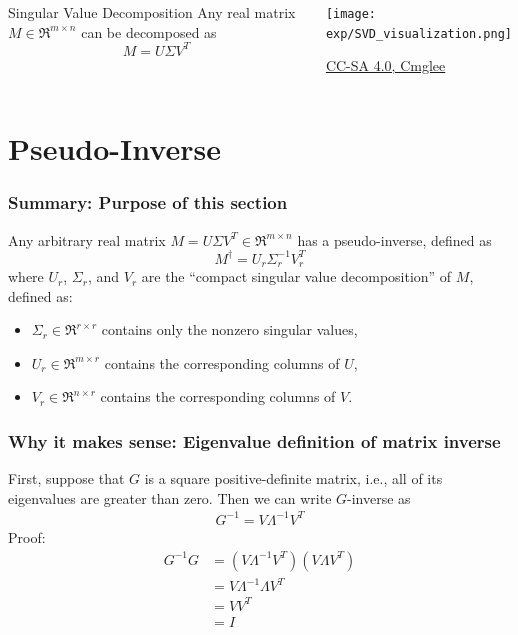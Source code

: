 \documentclass{beamer}
\begin{document}
\begin{frame}
  \begin{columns}[t]
    \column{2.5in}
    \begin{block}{Singular Value Decomposition}
      Any real matrix $M\in\Re^{m\times n}$ can be decomposed as
      \[
      M=U\Sigma V^T
      \]
    \end{block}
    \column{2.25in}
    \begin{block}{}
      \centerline{\texttt{[image: exp/SVD\_visualization.png]}}
      \centerline{\tiny\href{https://en.wikipedia.org/wiki/Singular_value_decomposition}{CC-SA 4.0, Cmglee}}
    \end{block}
  \end{columns}
\end{frame}

\section{Pseudo-Inverse}
\setcounter{subsection}{1}

\begin{frame}
  \frametitle{Summary: Purpose of this section}

  Any arbitrary real matrix $M=U\Sigma V^T\in\Re^{m\times n}$ has a
  pseudo-inverse, defined as
  \begin{displaymath}
    M^\dag = U_r\Sigma_r^{-1} V_r^T
  \end{displaymath}
  where $U_r$, $\Sigma_r$, and $V_r$ are the ``compact singular value
  decomposition'' of $M$, defined as:
  \begin{itemize}
  \item $\Sigma_r\in\Re^{r\times r}$ contains only the nonzero singular values,
  \item $U_r\in\Re^{m\times r}$ contains the corresponding columns of $U$,
  \item $V_r\in\Re^{n\times r}$ contains the corresponding columns of $V$.
  \end{itemize}
\end{frame}
  
\begin{frame}
  \frametitle{Why it makes sense: Eigenvalue definition of matrix inverse}

  First, suppose that $G$ is a square positive-definite matrix, i.e.,
  all of its eigenvalues are greater than zero.  Then we can write
  $G$-inverse as
  \begin{align*}
    G^{-1} = V\Lambda^{-1}V^T
  \end{align*}
  Proof:
  \begin{align*}
    G^{-1}G &= \left(V\Lambda^{-1}V^T\right)\left(V\Lambda V^T\right)\\
    &= V\Lambda^{-1}\Lambda V^T\\
    &= VV^T\\
    &= I
  \end{align*}
\end{frame}
\end{document}
